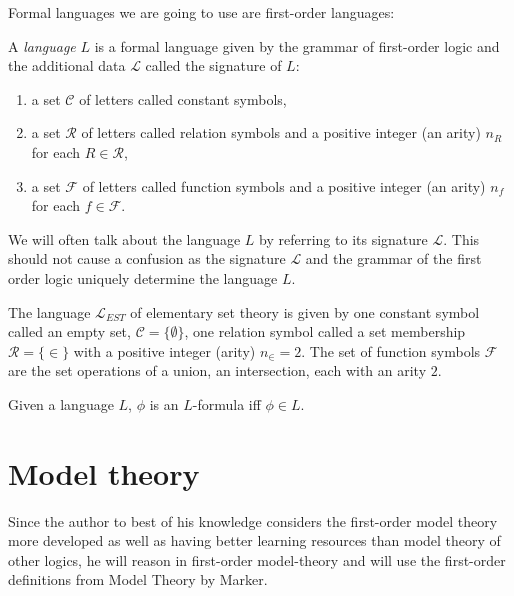 Formal languages we are going to use are first-order languages:
\begin{defn}
A \emph{language} $L$ is a formal language given by the grammar of first-order logic and the additional data $\mathcal{L}$ called the signature of $L$:
\begin{enumerate}
\item a set $\mathcal{C}$ of letters called constant symbols,
\item a set $\mathcal{R}$ of letters called relation symbols and a positive integer (an arity) $n_R$ for each $R \in \mathcal{R}$,
\item a set $\mathcal{F}$ of letters called function symbols and a positive integer (an arity) $n_f$ for each $f \in \mathcal{F}$.
\end{enumerate}
\end{defn}

\begin{remark}
We will often talk about the language $L$ by referring to its signature $\mathcal{L}$. This should not cause a confusion as the signature $\mathcal{L}$ and the grammar of the first order logic uniquely determine the language $L$.
\end{remark}

\begin{exmp}
The language $\mathcal{L}_{EST}$ of elementary set theory is given by one constant symbol called an empty set, $\mathcal{C}=\{\emptyset\}$, one relation symbol called a set membership $\mathcal{R}=\{\in\}$ with a positive integer (arity) $n_{\in}=2$. The set of function symbols $\mathcal{F}$ are the set operations of a union, an intersection, each with an arity $2$.
\end{exmp}

\begin{defn}
Given a language $L$, $\phi$ is an $L$-formula iff $\phi \in L$.
\end{defn}

\section{Model theory\cite{marker2002}}
Since the author to best of his knowledge considers the first-order model theory more developed as well as having better learning resources than model theory  of other logics, he will reason in first-order model-theory and will use the first-order definitions from Model Theory by Marker\cite{marker2002}.

